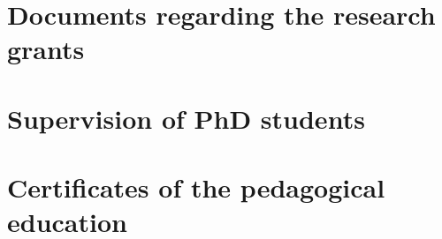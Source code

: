 \section{Documents regarding the research grants}
\label{sec:grants}
\vspace*{\fill}






\vspace*{\fill}
\section{Supervision of PhD students}
\label{cert:supervision}
\vspace*{\fill}






\vspace*{\fill}
\section{Certificates of the pedagogical education}
\label{sec:PedagogicalCert}
\vspace*{\fill}



